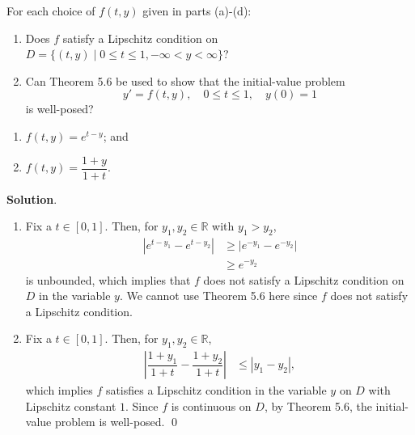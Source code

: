 \documentclass[11pt]{article}
\theoremstyle{break}
\numberwithin{equation}{theorem}
\begin{document}
\newpage
\begin{problem}\label{problem 2} %
    For each choice of $f(t, y)$ given in parts (a)-(d):
    \begin{enumerate}[label=\roman*.]
        \item Does $f$ satisfy a Lipschitz condition on $D=\{(t, y)\mid 0\leq t\leq1, -\infty<y<\infty\}$?
        \item Can Theorem 5.6 be used to show that the initial-value problem $$y'=f(t, y),\quad 0\leq t\leq 1, \quad y(0)=1$$ is well-posed?
    \end{enumerate}
    \begin{enumerate}
        \item $f(t, y)=e^{t-y}$; and
        \item $f(t, y)=\dfrac{1+y}{1+t}$.
    \end{enumerate}
\end{problem}
\textbf{Solution}. 
\begin{enumerate}
    \item Fix a $t\in[0, 1]$. Then, for $y_1, y_2\in\mathbb{R}$ with $y_1>y_2$, \begin{align*}
        \left|e^{t-y_1}-e^{t-y_2}\right|&\geq \left|e^{-y_1}-e^{-y_2}\right|\\
        &\geq e^{-y_2}
    \end{align*}
    is unbounded, which implies that $f$ does not satisfy a Lipschitz condition on $D$ in the variable $y$. We cannot use Theorem 5.6 here since $f$ does not satisfy a Lipschitz condition.
    \item Fix a $t\in[0, 1]$. Then, for $y_1, y_2\in\mathbb{R}$, \begin{align*}
        \left|\dfrac{1+y_1}{1+t}-\dfrac{1+y_2}{1+t}\right|&\leq|y_1-y_2|,
    \end{align*}
    which implies $f$ satisfies a Lipschitz condition in the variable $y$ on $D$ with Lipschitz constant $1$. Since $f$ is continuous on $D$, by Theorem 5.6, the initial-value problem is well-posed. \qed
\end{enumerate}
\end{document}

